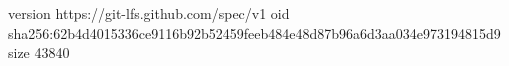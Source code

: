 version https://git-lfs.github.com/spec/v1
oid sha256:62b4d4015336ce9116b92b52459feeb484e48d87b96a6d3aa034e973194815d9
size 43840
